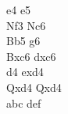 \documentclass{article}
\begin{document}
\begin{chessmoves}
e4 e5\\
Nf3 Nc6\\
Bb5 g6\\
Bxc6 dxc6\\
d4 exd4\\
Qxd4 Qxd4 \\
abc def
\end{chessmoves}
\end{document}
